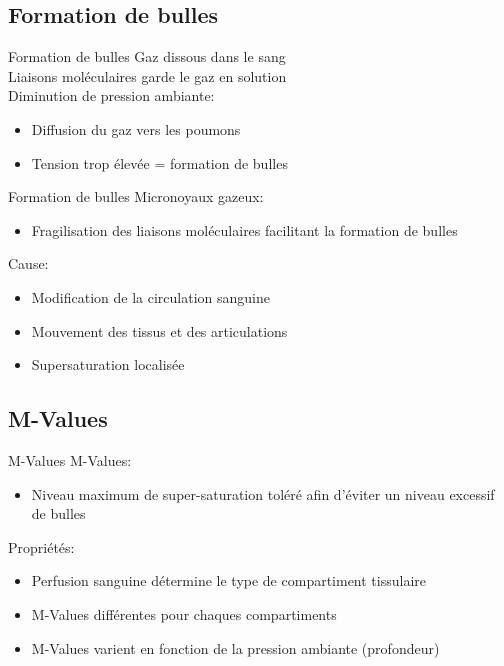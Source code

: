 \subsection{Formation de bulles}

\begin{frame}{Formation de bulles}  
	Gaz dissous dans le sang\\
	Liaisons moléculaires garde le gaz en solution\\
	Diminution de pression ambiante:
	\begin{itemize}
		\item Diffusion du gaz vers les poumons
		\item Tension trop élevée = formation de bulles
	\end{itemize}
\end{frame}

\begin{frame}{Formation de bulles}
	Micronoyaux gazeux:
	\begin{itemize}
		\item Fragilisation des liaisons moléculaires facilitant la formation de bulles
	\end{itemize}
	\vfill
	Cause:
	\begin{itemize}
		\item Modification de la circulation sanguine
		\item Mouvement des tissus et des articulations
		\item Supersaturation localisée
	\end{itemize}
\end{frame}

\subsection{M-Values}

\begin{frame}{M-Values}  
	M-Values:
	\begin{itemize}
		\item Niveau maximum de super-saturation toléré afin d'éviter un niveau excessif de bulles
	\end{itemize}
	\vfill
	Propriétés:
	\begin{itemize}
		\item Perfusion sanguine détermine le type de compartiment tissulaire
		\item M-Values différentes pour chaques compartiments
		\item M-Values varient en fonction de la pression ambiante (profondeur)
	\end{itemize}
\end{frame}

